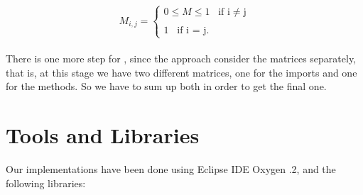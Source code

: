 \begin{equation}
  M_{i,j}=\begin{cases}
    0\leq M \leq 1 \; \; \; \text{if i} \neq \text{j}\\
    \\
    1 \; \; \; \text{if i = j}.
  \end{cases}
\end{equation}\\

There is one more step for \CLAN, since the approach consider the matrices separately, that is, at this stage we have two different matrices, one for the imports and one for the methods. So we have to sum up both in order to get the final one.


\section{Tools and Libraries}

Our implementations have been done using Eclipse IDE Oxygen .2, and the following libraries:

